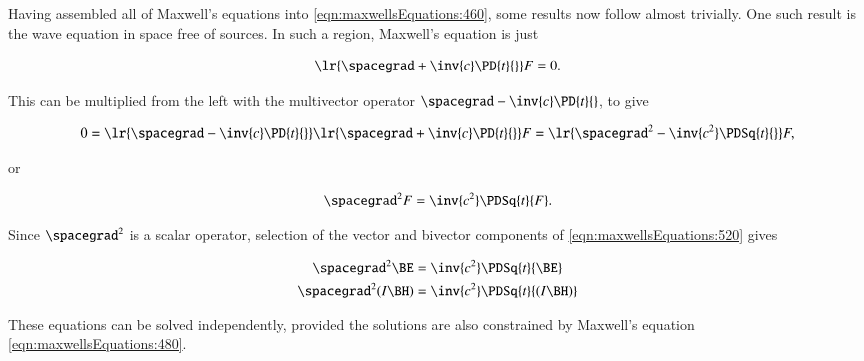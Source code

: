 %
%
Having assembled all of Maxwell's equations into \cref{eqn:maxwellsEquations:460}, some results now follow almost trivially.
One such result is the wave equation in space free of sources.
In such a region, Maxwell's equation is just

\begin{dmath}\label{eqn:maxwellsEquations:480}
\lr{ \spacegrad + \inv{c} \PD{t}{} } F = 0.
\end{dmath}

This can be multiplied from the left with the multivector operator \( \spacegrad - \inv{c} \PD{t}{} \), to give

\begin{dmath}\label{eqn:maxwellsEquations:500}
0 =
\lr{ \spacegrad - \inv{c} \PD{t}{} }
\lr{ \spacegrad + \inv{c} \PD{t}{} } F
=
\lr{ \spacegrad^2 - \inv{c^2} \PDSq{t}{} } F,
\end{dmath}

or

\begin{dmath}\label{eqn:maxwellsEquations:520}
\spacegrad^2 F = \inv{c^2} \PDSq{t}{F}.
\end{dmath}

Since \( \spacegrad^2 \) is a scalar operator, selection of the vector and bivector components of \cref{eqn:maxwellsEquations:520} gives

\begin{dmath}\label{eqn:maxwellsEquations:540}
\begin{aligned}
\spacegrad^2 \BE &= \inv{c^2} \PDSq{t}{\BE} \\
\spacegrad^2 (I \BH) &= \inv{c^2} \PDSq{t}{(I \BH)} \\
\end{aligned}
\end{dmath}

These equations can be solved independently, provided the solutions are also constrained by Maxwell's equation \cref{eqn:maxwellsEquations:480}.

